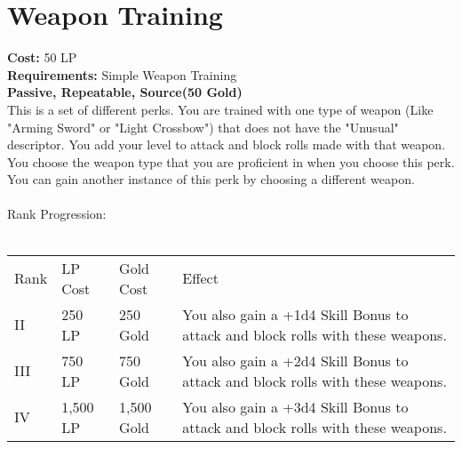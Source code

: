 \section{Weapon Training}\label{perk:weaponTraining}
\textbf{Cost:} 50 LP\\
\textbf{Requirements:} Simple Weapon Training\\
\textbf{Passive, Repeatable, Source(50 Gold)}\\
This is a set of different perks.
You are trained with one type of weapon (Like "Arming Sword" or "Light Crossbow") that does not have the "Unusual" descriptor.
You add your level to attack and block rolls made with that weapon.\\
You choose the weapon type that you are proficient in when you choose this perk.
You can gain another instance of this perk by choosing a different weapon.\\
\\
Rank Progression:\\
\\
\begin{longtable}{l | l | l | p{9cm}}
	Rank & LP Cost & Gold Cost & Effect\\
	II & 250 LP & 250 Gold & You also gain a +1d4 Skill Bonus to attack and block rolls with these weapons.\\
	III & 750 LP & 750 Gold & You also gain a +2d4 Skill Bonus to attack and block rolls with these weapons.\\
	IV & 1,500 LP & 1,500 Gold & You also gain a +3d4 Skill Bonus to attack and block rolls with these weapons.\\
\end{longtable}